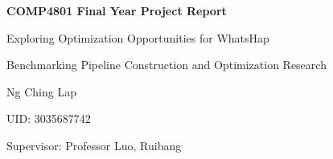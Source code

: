 \begin{titlepage}
\thispagestyle{empty}
\centering
\vspace*{\fill}

{\Huge \textbf{COMP4801 Final Year Project Report}\par}
\vspace{1cm}
{\LARGE Exploring Optimization Opportunities for WhatsHap\par}
{Benchmarking Pipeline Construction and Optimization Research\par}

\vspace{2cm}

{\large
Ng Ching Lap\par
UID: 3035687742\par
Supervisor: Professor Luo, Ruibang\par
}

\vspace*{\fill}
\end{titlepage}

\setcounter{page}{1}
\tableofcontents
\clearpage